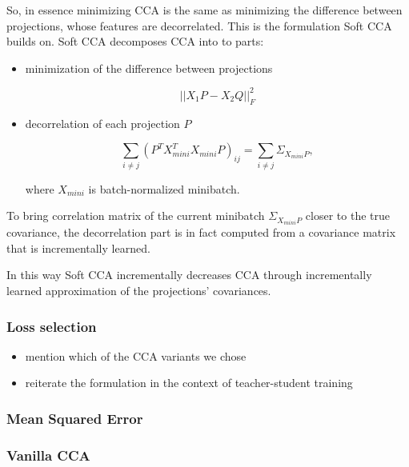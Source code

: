 So, in essence minimizing CCA is the same as minimizing the difference between
projections, whose features are decorrelated. This is the formulation Soft CCA
builds on. Soft CCA decomposes CCA into to parts:

\begin{itemize}
  \item minimization of the difference between projections

    \begin{equation}
      ||X_1P - X_2Q||^2_F
    \end{equation}

  \item decorrelation of each projection $P$

    \begin{equation}
      \sum_{i \ne j} (P^TX^T_{mini}X_{mini}P)_{ij} = \sum_{i \ne j} \Sigma_{X_{mini}P},
    \end{equation}

    where $X_{mini}$ is batch-normalized minibatch.

\end{itemize}

To bring correlation matrix of the current minibatch $\Sigma_{X_{mini}P}$
closer to the true covariance, the decorrelation part is in fact computed from
a covariance matrix that is incrementally learned.

In this way Soft CCA incrementally decreases CCA through incrementally learned
approximation of the projections' covariances.

\subsubsection{Loss selection}

\begin{itemize}
    \item mention which of the CCA variants we chose
    \item reiterate the formulation in the context of teacher-student training
\end{itemize}

\subsubsection{Mean Squared Error}
\subsubsection{Vanilla CCA}

